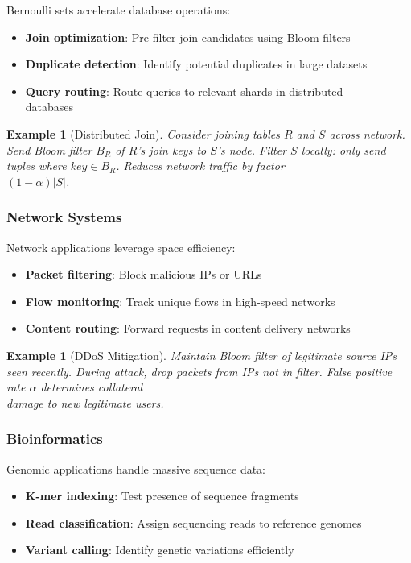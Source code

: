\documentclass[11pt]{article}
\newtheorem{example}[theorem]{Example}
\begin{document}
Bernoulli sets accelerate database operations:
\begin{itemize}
\item \textbf{Join optimization}: Pre-filter join candidates using Bloom filters
\item \textbf{Duplicate detection}: Identify potential duplicates in large datasets
\item \textbf{Query routing}: Route queries to relevant shards in distributed\\ databases
\end{itemize}

\begin{example}[Distributed Join]
Consider joining tables $R$ and $S$ across network. Send Bloom filter $B_R$ of $R$'s join keys to $S$'s node. Filter $S$ locally: only send tuples where $key \in B_R$. Reduces network traffic by factor\\ $(1-\alpha)|S|$.
\end{example}

\subsubsection{Network Systems}

Network applications leverage space efficiency:
\begin{itemize}
\item \textbf{Packet filtering}: Block malicious IPs or URLs
\item \textbf{Flow monitoring}: Track unique flows in high-speed networks
\item \textbf{Content routing}: Forward requests in content delivery networks
\end{itemize}

\begin{example}[DDoS Mitigation]
Maintain Bloom filter of legitimate source IPs seen recently. During attack, drop packets from IPs not in filter. False positive rate $\alpha$ determines collateral\\ damage to new legitimate users.
\end{example}

\subsubsection{Bioinformatics}

Genomic applications handle massive sequence data:
\begin{itemize}
\item \textbf{K-mer indexing}: Test presence of sequence fragments
\item \textbf{Read classification}: Assign sequencing reads to reference genomes
\item \textbf{Variant calling}: Identify genetic variations efficiently
\end{itemize}
\end{document}
